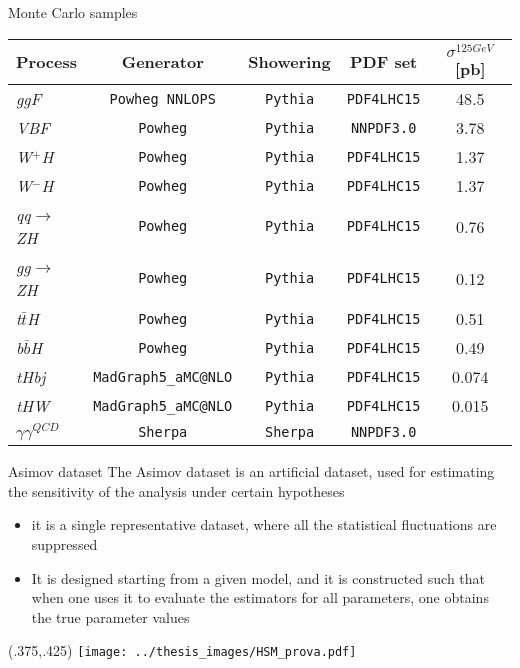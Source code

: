 \documentclass[10pt,UKenglish, leqno, xcolor = dvipsnames]{beamer}
\begin{document}
		\begin{frame}{Monte Carlo samples}
			\vfill
			\centering
			\begin{table}[tbp]
				\centering
				\begin{tabular}{lcccc}
					\toprule[1.5pt]
					Process					& Generator						& Showering			& PDF set				& $\sigma^{125 GeV}$ [pb]		\\
					\midrule
					\textit{ggF}			& \texttt{Powheg NNLOPS}		& \texttt{Pythia}	& \texttt{PDF4LHC15}	& 48.5				\\
					\textit{VBF}			& \texttt{Powheg}				& \texttt{Pythia}	& \texttt{NNPDF3.0}		& 3.78				\\
					\textit{W$^+$H}			& \texttt{Powheg}				& \texttt{Pythia}	& \texttt{PDF4LHC15}	& 1.37				\\
					\textit{W$^-$H}			& \texttt{Powheg}				& \texttt{Pythia}	& \texttt{PDF4LHC15}	& 1.37				\\
					\textit{qq$\to$ZH}		& \texttt{Powheg}				& \texttt{Pythia}	& \texttt{PDF4LHC15}	& 0.76				\\
					\textit{gg$\to$ZH}		& \texttt{Powheg}				& \texttt{Pythia}	& \texttt{PDF4LHC15}	& 0.12				\\
					\textit{t$\bar{t}$H}	& \texttt{Powheg}				& \texttt{Pythia}	& \texttt{PDF4LHC15}	& 0.51				\\
					\textit{b$\bar{b}$H}	& \texttt{Powheg}				& \texttt{Pythia}	& \texttt{PDF4LHC15}	& 0.49				\\
					\textit{tHbj}			& \texttt{MadGraph5\_aMC@NLO}	& \texttt{Pythia}	& \texttt{PDF4LHC15}	& 0.074				\\
					\textit{tHW}			& \texttt{MadGraph5\_aMC@NLO}	& \texttt{Pythia}	& \texttt{PDF4LHC15}	& 0.015				\\
					\midrule
					\textit{$\gamma\gamma^{QCD}$} &  \texttt{Sherpa}		& \texttt{Sherpa}	& \texttt{NNPDF3.0}		&					\\
					\bottomrule[1.5pt]	
				\end{tabular}
			\end{table}	
			\vfill
		\end{frame}
	
		\begin{frame}{Asimov dataset}
			\vspace{.2cm}
			The Asimov dataset is an artificial dataset, used for estimating the sensitivity of the analysis under certain hypotheses
			\begin{itemize}
				\item it is a single representative dataset, where all the statistical fluctuations are suppressed
				\item It is designed starting from a given model, and it is constructed such that when one uses it to evaluate the estimators for all parameters, one obtains the true parameter values
			\end{itemize}
			\begin{textblock}{1}(.375,.425)
				\texttt{[image: ../thesis\_images/HSM\_prova.pdf]}
			\end{textblock}
		\end{frame}
	
\end{document}
